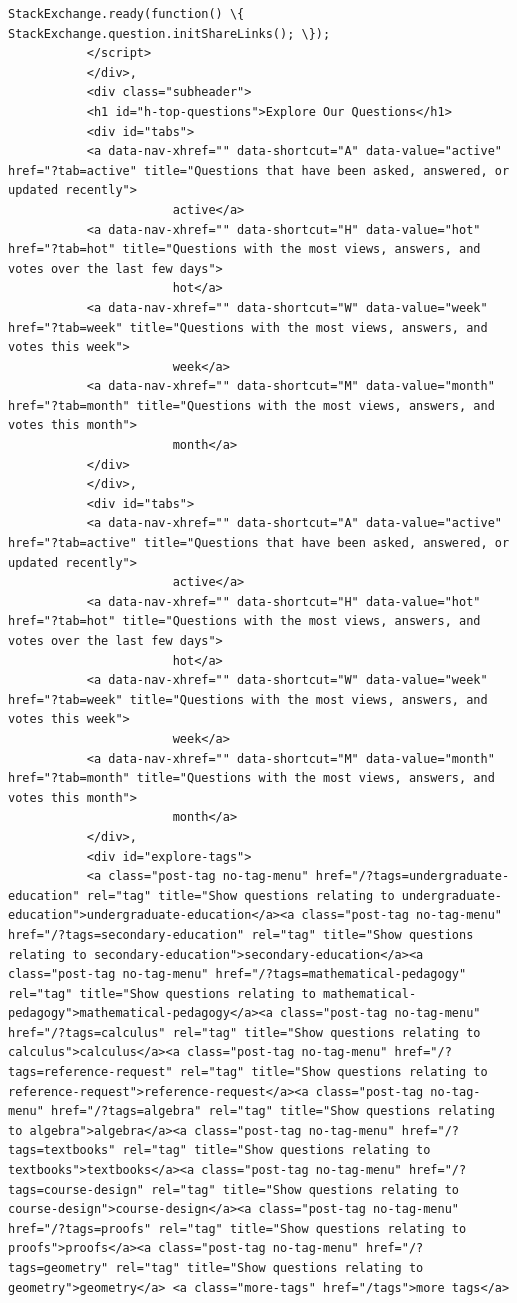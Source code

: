 \documentclass[11pt]{article}
\begin{document}
\begin{Verbatim}[commandchars=\\\{\}]
               StackExchange.ready(function() \{ StackExchange.question.initShareLinks(); \});
           </script>
           </div>,
           <div class="subheader">
           <h1 id="h-top-questions">Explore Our Questions</h1>
           <div id="tabs">
           <a data-nav-xhref="" data-shortcut="A" data-value="active" href="?tab=active" title="Questions that have been asked, answered, or updated recently">
                       active</a>
           <a data-nav-xhref="" data-shortcut="H" data-value="hot" href="?tab=hot" title="Questions with the most views, answers, and votes over the last few days">
                       hot</a>
           <a data-nav-xhref="" data-shortcut="W" data-value="week" href="?tab=week" title="Questions with the most views, answers, and votes this week">
                       week</a>
           <a data-nav-xhref="" data-shortcut="M" data-value="month" href="?tab=month" title="Questions with the most views, answers, and votes this month">
                       month</a>
           </div>
           </div>,
           <div id="tabs">
           <a data-nav-xhref="" data-shortcut="A" data-value="active" href="?tab=active" title="Questions that have been asked, answered, or updated recently">
                       active</a>
           <a data-nav-xhref="" data-shortcut="H" data-value="hot" href="?tab=hot" title="Questions with the most views, answers, and votes over the last few days">
                       hot</a>
           <a data-nav-xhref="" data-shortcut="W" data-value="week" href="?tab=week" title="Questions with the most views, answers, and votes this week">
                       week</a>
           <a data-nav-xhref="" data-shortcut="M" data-value="month" href="?tab=month" title="Questions with the most views, answers, and votes this month">
                       month</a>
           </div>,
           <div id="explore-tags">
           <a class="post-tag no-tag-menu" href="/?tags=undergraduate-education" rel="tag" title="Show questions relating to undergraduate-education">undergraduate-education</a><a class="post-tag no-tag-menu" href="/?tags=secondary-education" rel="tag" title="Show questions relating to secondary-education">secondary-education</a><a class="post-tag no-tag-menu" href="/?tags=mathematical-pedagogy" rel="tag" title="Show questions relating to mathematical-pedagogy">mathematical-pedagogy</a><a class="post-tag no-tag-menu" href="/?tags=calculus" rel="tag" title="Show questions relating to calculus">calculus</a><a class="post-tag no-tag-menu" href="/?tags=reference-request" rel="tag" title="Show questions relating to reference-request">reference-request</a><a class="post-tag no-tag-menu" href="/?tags=algebra" rel="tag" title="Show questions relating to algebra">algebra</a><a class="post-tag no-tag-menu" href="/?tags=textbooks" rel="tag" title="Show questions relating to textbooks">textbooks</a><a class="post-tag no-tag-menu" href="/?tags=course-design" rel="tag" title="Show questions relating to course-design">course-design</a><a class="post-tag no-tag-menu" href="/?tags=proofs" rel="tag" title="Show questions relating to proofs">proofs</a><a class="post-tag no-tag-menu" href="/?tags=geometry" rel="tag" title="Show questions relating to geometry">geometry</a> <a class="more-tags" href="/tags">more tags</a>

\end{Verbatim}
\end{document}
